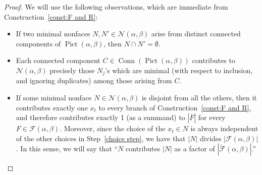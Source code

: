 \documentclass[noamsfonts,10pt]{amsart}
\newcommand{\NN}{\mathcal{N}}
\newcommand{\D}{\mathcal{D}}
\newcommand{\al}{\alpha}
\newcommand{\be}{\beta}
\DeclareMathOperator{\Pic}{Pict}
\newcommand{\F}{\mathcal{F}}
\DeclareMathOperator{\Conn}{Conn}
\newcommand{\1}{\mathbf{1}}
\theoremstyle{plain}
\theoremstyle{definition}
\numberwithin{equation}{section}
\begin{document}
\begin{proof}

We will use the following observations, which are immediate from Construction~\ref{const:F and R}:
        \begin{itemize}
            \item If two minimal nonfaces $N, N' \in \NN(\al,\be)$ arise from distinct connected components of $\Pic(\al,\be)$, then $N \cap N' = \emptyset$.
            \item Each connected component $C \in \Conn(\Pic(\al,\be))$ contributes to $\NN(\al,\be)$ precisely those $N_j$'s which are minimal (with respect to inclusion, and ignoring duplicates) among those arising from $C$.

            \item If some minimal nonface $N \in \NN(\al,\be)$ is disjoint from all the others, then it contributes exactly one $x_t$ to every branch of Construction~\ref{const:F and R}, and therefore contributes exactly 1 (as a summand) to $|\overline{F}|$ for every $F \in \F(\al,\be)$.
            Moreover, since the choice of the $x_t \in N$ is always independent of the other choices in Step~\ref{choice step}, we have that $|N|$ divides $|\F(\al,\be)|$.
            In this sense, we will say that ``$N$ contributes $|N|$ as a factor of $| \widetilde{\F}(\al,\be) |$.''
        \end{itemize}

    \begin{table}[t]
        \centering
        
        \caption{Assuming that $\Pic(\al,\be) = D \in \D_{pq}$, we list all possible types of connected components $C \in \Conn(D)$.
        The second column gives the minimal nonface(s) $N \in \NN(\al,\be)$ arising from each~$C$.
        The third column counts the number of $x_t$'s which are chosen from these $N$'s in Step~\ref{choice step} of Construction~\ref{const:F and R};
        each $x_t$ contributes 1 to $|\overline{F}|$.
        The fourth column counts how many choices of $x_t$'s are possible from these $N$'s when constructing some $F \in \widetilde{\F}(\al,\be)$.}
        \label{table:Conn(D)}
    \end{table}


\end{proof}
\end{document}
